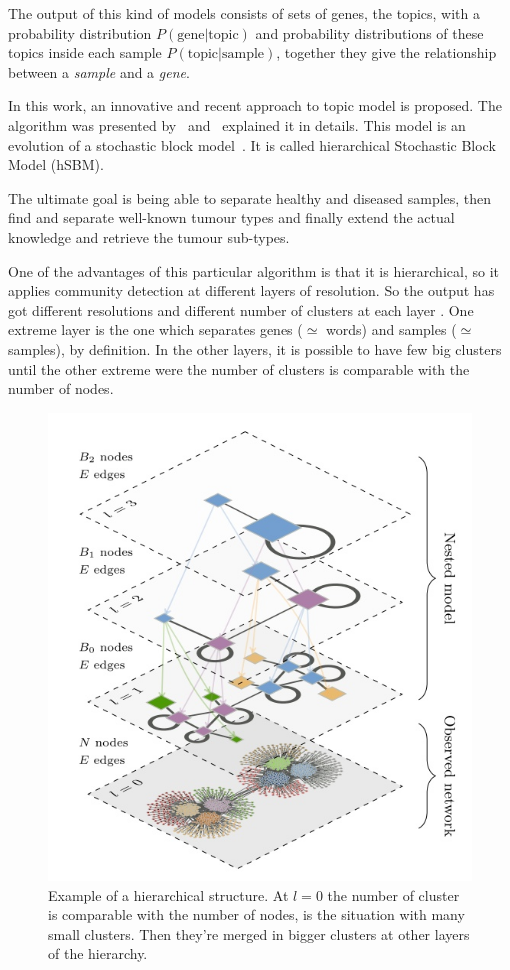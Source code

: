 The output of this kind of models consists of sets of genes, the topics, with a probability distribution $P(\text{gene} | \text{topic})$ and probability distributions of these topics inside each sample $P(\text{topic} | \text{sample})$, together they give the relationship between a \textit{sample} and a \textit{gene}.

In this work, an innovative and recent approach to topic model is proposed. The algorithm was presented by~\cite{gerlach2018network} and~\cite{Peixoto2017} explained it in details. This model is an evolution of a stochastic block model~\cite{Holland1983}. It is called hierarchical Stochastic Block Model (hSBM).

The ultimate goal is being able to separate healthy and diseased samples, then find and separate well-known tumour types and finally extend the actual knowledge and retrieve the tumour sub-types.

One of the advantages of this particular algorithm is that it is hierarchical, so it applies community detection at different layers of resolution. So the output has got different resolutions and different number of clusters at each layer . One extreme layer is the one which separates genes ($\simeq$ words) and samples ($\simeq$ samples), by definition. In the other layers, it is possible to have few big clusters until the other extreme were the number of clusters is comparable with the number of nodes.
\begin{figure}[htb!]
  \centering
  \includegraphics[width=0.6\linewidth]{pictures/topic/peixioto_hierarchic.jpg}
  \caption{Example of a hierarchical structure. At $l=0$ the number of cluster is comparable with the number of nodes, is the situation with many small clusters. Then they're merged in bigger clusters at other layers of the hierarchy.}
  \label{fig:topic_peixioto_hierarchic}
\end{figure}

